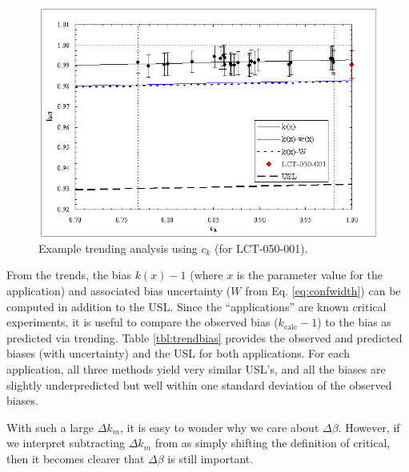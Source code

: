 \begin{figure}[htp] 
    \centering
    \includegraphics[keepaspectratio, width = 5 in]{images/trend_ck2}
    \caption{Example trending analysis using $c_k$ (for LCT-050-001).}
    \label{fig:trend_ck2}
\end{figure}

From the trends, the bias $k(x)-1$ (where $x$ is the parameter value 
for the application) and associated bias uncertainty (\ie $W$ from 
Eq. \ref{eq:confwidth}) can be computed in addition to the USL.  
Since the ``applications'' are known critical experiments, it is useful 
to compare the observed bias (\ie $k_{\mathrm{calc}} -1$) to the bias 
as predicted via trending.  Table \ref{tbl:trendbias} provides the 
observed and predicted biases (with uncertainty) and the USL for both 
applications.  For each application, all three methods yield very similar 
USL's, and all the biases are slightly underpredicted but well within 
one standard deviation of the observed biases.  

With such a large $\Delta k_m$, it is easy to wonder why we care 
about $\Delta \beta$. However, if we interpret subtracting $\Delta k_m$ 
from \keff as simply shifting the definition of critical, then it 
becomes clearer that $\Delta \beta$ is still important.

